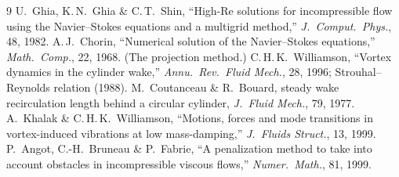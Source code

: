 \documentclass[11pt,a4paper]{article}
\begin{document}
\begin{thebibliography}{9}
\small
{} U.\ Ghia, K.\,N.\ Ghia \& C.\,T.\ Shin, ``High-Re solutions for incompressible flow
  using the Navier--Stokes equations and a multigrid method,'' \emph{J.\ Comput.\ Phys.}, 48, 1982.
 A.\,J.\ Chorin, ``Numerical solution of the Navier--Stokes equations,''
  \emph{Math.\ Comp.}, 22, 1968. (The projection method.)
 C.\,H.\,K.\ Williamson, ``Vortex dynamics in the cylinder wake,''
  \emph{Annu.\ Rev.\ Fluid Mech.}, 28, 1996; Strouhal--Reynolds relation (1988).
 M.\ Coutanceau \& R.\ Bouard, steady wake recirculation length behind a
  circular cylinder, \emph{J.\ Fluid Mech.}, 79, 1977.
 A.\ Khalak \& C.\,H.\,K.\ Williamson, ``Motions, forces and mode transitions in
  vortex-induced vibrations at low mass-damping,'' \emph{J.\ Fluids Struct.}, 13, 1999.
 P.\ Angot, C.-H.\ Bruneau \& P.\ Fabrie, ``A penalization method to take into
  account obstacles in incompressible viscous flows,'' \emph{Numer.\ Math.}, 81, 1999.
\end{thebibliography}
\end{document}
